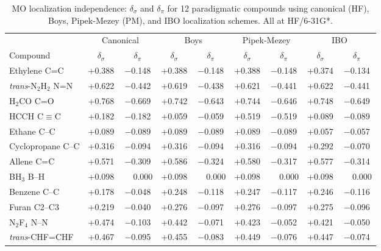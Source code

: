 \documentclass[11pt,a4paper]{article}
\begin{document}
\begin{table}[h!]
\centering
\caption{MO localization independence: $\delta_\sigma$ and $\delta_\pi$
for 12 paradigmatic compounds using canonical (HF), Boys, Pipek-Mezey (PM),
and IBO localization schemes. All at HF/6-31G*.}
\label{tab:SI_lmo}
\small
\begin{tabular}{lcccccccc}
\toprule
& \multicolumn{2}{c}{Canonical} & \multicolumn{2}{c}{Boys} & \multicolumn{2}{c}{Pipek-Mezey} & \multicolumn{2}{c}{IBO} \\
\cmidrule(lr){2-3}\cmidrule(lr){4-5}\cmidrule(lr){6-7}\cmidrule(lr){8-9}
Compound & $\delta_\sigma$ & $\delta_\pi$ & $\delta_\sigma$ & $\delta_\pi$ & $\delta_\sigma$ & $\delta_\pi$ & $\delta_\sigma$ & $\delta_\pi$ \\
\midrule
Ethylene C=C            & +0.388 & $-$0.148 & +0.388 & $-$0.148 & +0.388 & $-$0.148 & +0.374 & $-$0.134 \\
\textit{trans}-N$_2$H$_2$ N=N & +0.622 & $-$0.442 & +0.619 & $-$0.438 & +0.621 & $-$0.441 & +0.622 & $-$0.441 \\
H$_2$CO C=O             & +0.768 & $-$0.669 & +0.742 & $-$0.643 & +0.744 & $-$0.646 & +0.748 & $-$0.649 \\
HCCH C$\equiv$C         & +0.182 & $-$0.182 & +0.059 & $-$0.059 & +0.519 & $-$0.519 & +0.089 & $-$0.089 \\
Ethane C--C             & +0.089 & $-$0.089 & +0.089 & $-$0.089 & +0.089 & $-$0.089 & +0.057 & $-$0.057 \\
Cyclopropane C--C       & +0.316 & $-$0.094 & +0.316 & $-$0.094 & +0.316 & $-$0.094 & +0.292 & $-$0.070 \\
Allene C=C              & +0.571 & $-$0.309 & +0.586 & $-$0.324 & +0.580 & $-$0.317 & +0.577 & $-$0.314 \\
BH$_3$ B--H             & +0.098 & $\phantom{-}$0.000 & +0.098 & $\phantom{-}$0.000 & +0.098 & $\phantom{-}$0.000 & +0.098 & $\phantom{-}$0.000 \\
Benzene C--C            & +0.178 & $-$0.048 & +0.248 & $-$0.118 & +0.247 & $-$0.117 & +0.246 & $-$0.116 \\
Furan C2--C3            & +0.219 & $-$0.040 & +0.276 & $-$0.097 & +0.276 & $-$0.097 & +0.275 & $-$0.096 \\
N$_2$F$_4$ N--N         & +0.474 & $-$0.103 & +0.442 & $-$0.071 & +0.423 & $-$0.052 & +0.421 & $-$0.050 \\
\textit{trans}-CHF=CHF  & +0.467 & $-$0.095 & +0.455 & $-$0.083 & +0.449 & $-$0.076 & +0.447 & $-$0.074 \\
\bottomrule
\end{tabular}
\end{table}
\end{document}

